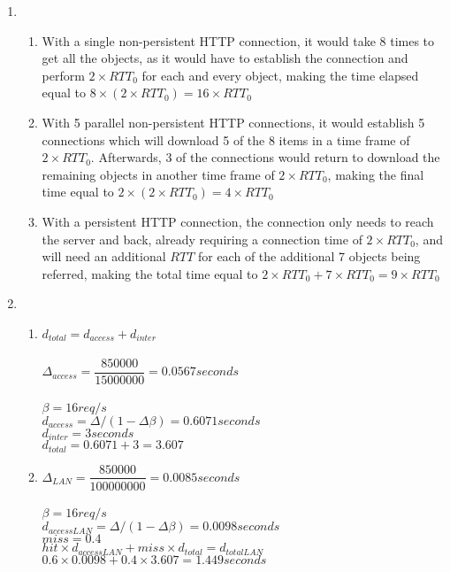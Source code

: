 \documentclass[12pt]{article}
\begin{document}
\begin{enumerate}
	\item \begin{enumerate}
			\item With a single non-persistent HTTP connection, it would take 8 times to get all the objects, as it would have to establish the connection and perform $2\times RTT_0$ for each and every object, making the time elapsed equal to $8\times (2\times RTT_0) = 16 \times RTT_0$
			\item With 5 parallel non-persistent HTTP connections, it would establish 5 connections which will download 5 of the 8 items in a time frame of $2\times RTT_0$. Afterwards, 3 of the connections would return to download the remaining objects in another time frame of $2\times RTT_0$, making the final time equal to $2\times (2\times RTT_0) = 4\times RTT_0$
			\item With a persistent HTTP connection, the connection only needs to reach the server and back, already requiring a connection time of $2\times RTT_0$, and will need an additional $RTT$ for each of the additional 7 objects being referred, making the total time equal to $2\times RTT_0 + 7\times RTT_0 = 9\times RTT_0$
		\end{enumerate}

	\item \begin{enumerate}
			\item $d_{total} = d_{access} + d_{inter}$\\
				\\
				$\Delta_{access} = \dfrac{850000}{15000000} = 0.0567 seconds$\\
				\\
				$\beta = 16req/s$\\
				$d_{access} = \Delta / (1 - \Delta \beta) = 0.6071 seconds$\\
				$d_{inter} = 3 seconds$\\
				$d_{total} = 0.6071 + 3 = 3.607$\\
			\item $\Delta_{LAN} = \dfrac{850000}{100000000} = 0.0085 seconds$\\
				\\
				$\beta = 16req/s$\\
				$d_{accessLAN} = \Delta / (1 - \Delta \beta) = 0.0098 seconds$\\
				$miss = 0.4$\\
				$hit\times d_{accessLAN} + miss\times d_{total} = d_{totalLAN}$\\
				$0.6\times 0.0098 + 0.4\times 3.607 = 1.449seconds$\\


\end{enumerate}
\end{enumerate}
\end{document}
